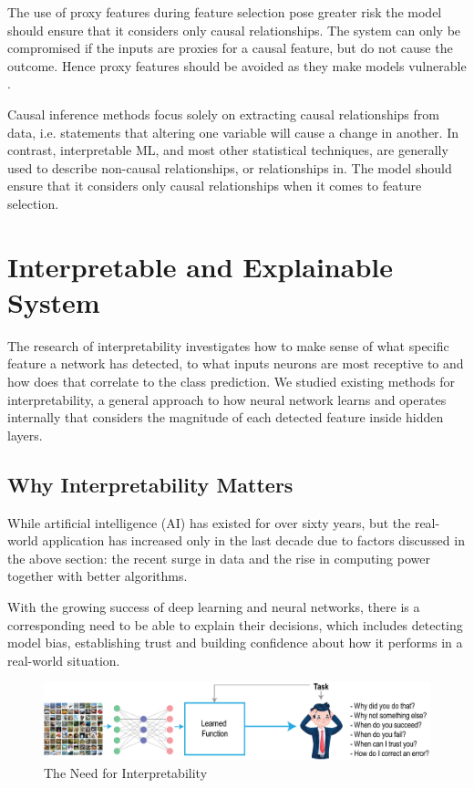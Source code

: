 The use of proxy features during feature selection pose greater risk the model should ensure that it considers only causal relationships. The system can only be compromised if the inputs are proxies for a causal feature, but do not cause the outcome. Hence proxy features should be avoided as they make models vulnerable \cite{molnar}.

Causal inference methods focus solely on extracting causal relationships from data, i.e. statements that altering one variable will cause a change in another. In contrast, interpretable ML, and most other statistical techniques, are generally used to describe non-causal relationships, or relationships in. The model should ensure that it considers only causal relationships when it comes to feature selection.

\section{Interpretable and Explainable System}

The research of interpretability investigates how to make sense of what specific feature a network has detected, to what inputs neurons are most receptive to and how does that correlate to the class prediction. We studied existing methods for interpretability, a general approach to how neural network learns and operates internally that considers the magnitude of each detected feature inside hidden layers.

\subsection{Why Interpretability Matters}

While artificial intelligence (AI) has existed for over sixty years, but the real-world application has increased only in the last decade due to factors discussed in the above section: the recent surge in data and the rise in computing power together with better algorithms.

With the growing success of deep learning and neural networks, there is a corresponding need to be able to explain their decisions, which includes detecting model bias, establishing trust and building confidence about how it performs in a real-world situation.

\begin{figure}[htbp]
\centering
\includegraphics[width=1\textwidth]{images/xa-concept-part-1.eps}
\caption{The Need for Interpretability}
\label{fig:Why Interpretability Matters}
\end{figure}

